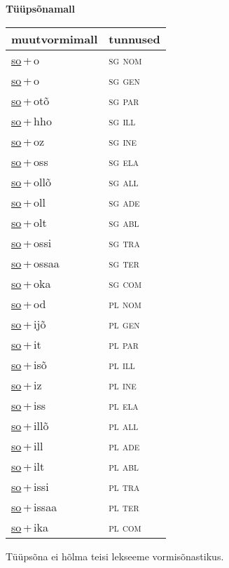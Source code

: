 
\vspace{1.8em}
\begin{minipage}{\textwidth}
\textbf{Tüüpsõnamall \,}\\

\begin{sideways}
\begin{tabular}{l l}
muutvormimall & tunnused \\
\hline
\underline{so}\,+\,o & \textsc{ sg nom } \\
\underline{so}\,+\,o & \textsc{ sg gen } \\
\underline{so}\,+\,otõ & \textsc{ sg par } \\
\underline{so}\,+\,hho & \textsc{ sg ill } \\
\underline{so}\,+\,oz & \textsc{ sg ine } \\
\underline{so}\,+\,oss & \textsc{ sg ela } \\
\underline{so}\,+\,ollõ & \textsc{ sg all } \\
\underline{so}\,+\,oll & \textsc{ sg ade } \\
\underline{so}\,+\,olt & \textsc{ sg abl } \\
\underline{so}\,+\,ossi & \textsc{ sg tra } \\
\underline{so}\,+\,ossaa & \textsc{ sg ter } \\
\underline{so}\,+\,oka & \textsc{ sg com } \\
\underline{so}\,+\,od & \textsc{ pl nom } \\
\underline{so}\,+\,ijõ & \textsc{ pl gen } \\
\underline{so}\,+\,it & \textsc{ pl par } \\
\underline{so}\,+\,isõ & \textsc{ pl ill } \\
\underline{so}\,+\,iz & \textsc{ pl ine } \\
\underline{so}\,+\,iss & \textsc{ pl ela } \\
\underline{so}\,+\,illõ & \textsc{ pl all } \\
\underline{so}\,+\,ill & \textsc{ pl ade } \\
\underline{so}\,+\,ilt & \textsc{ pl abl } \\
\underline{so}\,+\,issi & \textsc{ pl tra } \\
\underline{so}\,+\,issaa & \textsc{ pl ter } \\
\underline{so}\,+\,ika & \textsc{ pl com } \\
\end{tabular}
\end{sideways}
\label{tab:tüüpsõnamall-soo}

\end{minipage}

 
\vspace{1em}
\noindent Tüüpsõna ei hõlma teisi lekseeme vormi\-sõnastikus.
